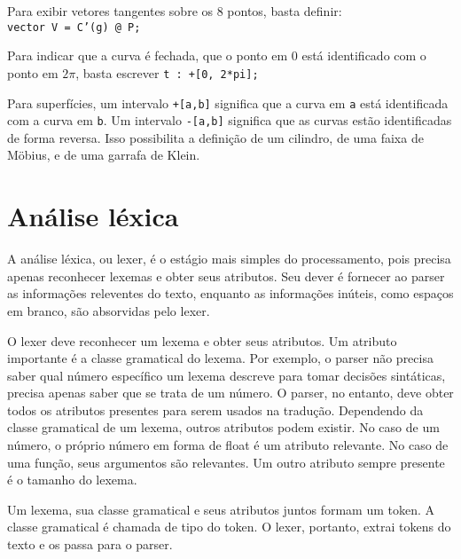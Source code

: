 \documentclass[10pt,a4paper]{article}
\begin{document}
Para exibir vetores tangentes sobre os 8 pontos, basta definir:\\ \texttt{vector V = C'(g) @ P;}

Para indicar que a curva é fechada, que o ponto em $0$ está identificado com o ponto em $2\pi$,
basta escrever \texttt{t : +[0, 2*pi];}

Para superfícies, um intervalo \texttt{+[a,b]} significa que a curva em \texttt{a}
está identificada com a curva em \texttt{b}.
Um intervalo \texttt{-[a,b]} significa que as curvas estão identificadas de forma reversa.
Isso possibilita a definição de um cilindro, de uma faixa de Möbius, e de uma garrafa de Klein.

\section{Análise léxica}
A análise léxica, ou lexer, é o estágio mais simples do processamento, pois precisa apenas reconhecer lexemas
e obter seus atributos. Seu dever é fornecer ao parser as informações releventes do texto, enquanto as informações inúteis, como espaços em branco, são absorvidas pelo lexer.

O lexer deve reconhecer um lexema e obter seus atributos.
Um atributo importante é a classe gramatical do lexema.
Por exemplo, o parser não precisa saber qual número específico um lexema descreve para tomar decisões sintáticas, 
precisa apenas saber que se trata de um número.
O parser, no entanto, deve obter todos os atributos presentes para serem usados na tradução.
Dependendo da classe gramatical de um lexema, outros atributos podem existir.
No caso de um número, o próprio número em forma de float é um atributo relevante.
No caso de uma função, seus argumentos são relevantes. Um outro atributo sempre presente é o tamanho do lexema.

Um lexema, sua classe gramatical e seus atributos juntos formam um token. A classe gramatical é chamada de tipo do token. O lexer, portanto, extrai tokens do texto e os passa para o parser.
\end{document}
